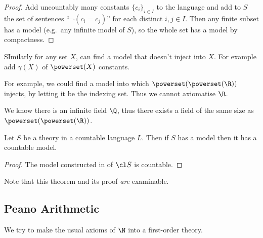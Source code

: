 \documentclass[a4paper]{article}
\begin{document}
\begin{proof}
  Add uncountably many constants \(\{c_i\}_{i \in I}\) to the language and add to \(S\) the set of sentences ``\(\neg(c_i = c_j)\)'' for each distinct \(i, j \in I\). Then any finite subset has a model (e.g.\ any infinite model of \(S\)), so the whole set has a model by compactness.
\end{proof}

\begin{remark}
  SImilarly for any set \(X\), can find a model that doesn't inject into \(X\). For example add \(\gamma(X)\) of \(\powerset(X)\) constants.
\end{remark}

For example, we could find a model into which \(\powerset (\powerset(\R))\) injects, by letting it be the indexing set. Thus we cannot axiomatise \(\R\).

\begin{eg}
  We know there is an infinite field \(\Q\), thus there exists a field of the same size as \(\powerset (\powerset(\R))\).
\end{eg}

\begin{corollary}
  Let \(S\) be a theory in a countable language \(L\). Then if \(S\) has a model then it has a countable model.
\end{corollary}

\begin{proof}
  The model constructed in  of \(\cl S\) is countable.
\end{proof}

Note that this theorem and its proof \emph{are} examinable.

\subsection{Peano Arithmetic}

We try to make the usual axioms of \(\N\) into a first-order theory.
\end{document}
